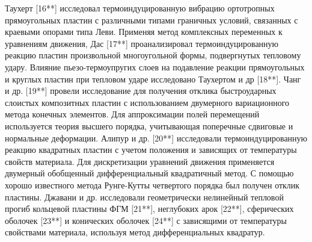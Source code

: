 Таухерт [16**] исследовал термоиндуцированную вибрацию ортотропных прямоугольных пластин с различными типами граничных условий, связанных с краевыми опорами типа Леви.  Применяя метод комплексных переменных к уравнениям движения, Дас [17**] проанализировал термоиндуцированную реакцию пластин произвольной многоугольной формы, подвергнутых тепловому удару.  Влияние пьезо-термоупругих слоев на подавление реакции прямоугольных и круглых пластин при тепловом ударе исследовано Таухертом и др [18**]. Чанг и др. [19**] провели исследование для получения отклика быстроударных слоистых композитных пластин с использованием двумерного вариационного метода конечных элементов. Для аппроксимации полей перемещений используется теория высшего порядка, учитывающая поперечные сдвиговые и нормальные деформации. Алипур и др. [20**] исследовали термоиндуцированную реакцию квадратных пластин с учетом положения и зависящих от температуры свойств материала. Для дискретизации уравнений движения применяется двумерный обобщенный дифференциальный квадратичный метод.  С помощью хорошо известного метода Рунге-Кутты четвертого порядка был получен отклик пластины. Джавани и др. исследовали геометрически нелинейный тепловой прогиб кольцевой пластины ФГМ [21**], неглубоких арок [22**], сферических оболочек [23**] и конических оболочек [24**] с зависящими от температуры свойствами материала, используя метод дифференциальных квадратур.



